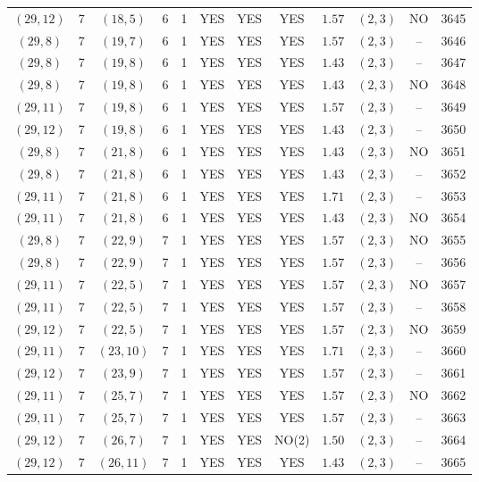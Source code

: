 \begin{longtable}{|c|c|c|c|c|c|c|c|c|c|c|c|}
$(29,12)$ & 7 & $(18,5)$ & 6 & 1 & YES & YES & YES & $1.57$ & $(2,3)$ & NO & 3645\\
$(29,8)$ & 7 & $(19,7)$ & 6 & 1 & YES & YES & YES & $1.57$ & $(2,3)$ & -- & 3646\\
$(29,8)$ & 7 & $(19,8)$ & 6 & 1 & YES & YES & YES & $1.43$ & $(2,3)$ & -- & 3647\\
$(29,8)$ & 7 & $(19,8)$ & 6 & 1 & YES & YES & YES & $1.43$ & $(2,3)$ & NO & 3648\\
$(29,11)$ & 7 & $(19,8)$ & 6 & 1 & YES & YES & YES & $1.57$ & $(2,3)$ & -- & 3649\\
$(29,12)$ & 7 & $(19,8)$ & 6 & 1 & YES & YES & YES & $1.43$ & $(2,3)$ & -- & 3650\\
$(29,8)$ & 7 & $(21,8)$ & 6 & 1 & YES & YES & YES & $1.43$ & $(2,3)$ & NO & 3651\\
$(29,8)$ & 7 & $(21,8)$ & 6 & 1 & YES & YES & YES & $1.43$ & $(2,3)$ & -- & 3652\\
$(29,11)$ & 7 & $(21,8)$ & 6 & 1 & YES & YES & YES & $1.71$ & $(2,3)$ & -- & 3653\\
$(29,11)$ & 7 & $(21,8)$ & 6 & 1 & YES & YES & YES & $1.43$ & $(2,3)$ & NO & 3654\\
$(29,8)$ & 7 & $(22,9)$ & 7 & 1 & YES & YES & YES & $1.57$ & $(2,3)$ & NO & 3655\\
$(29,8)$ & 7 & $(22,9)$ & 7 & 1 & YES & YES & YES & $1.57$ & $(2,3)$ & -- & 3656\\
$(29,11)$ & 7 & $(22,5)$ & 7 & 1 & YES & YES & YES & $1.57$ & $(2,3)$ & NO & 3657\\
$(29,11)$ & 7 & $(22,5)$ & 7 & 1 & YES & YES & YES & $1.57$ & $(2,3)$ & -- & 3658\\
$(29,12)$ & 7 & $(22,5)$ & 7 & 1 & YES & YES & YES & $1.57$ & $(2,3)$ & NO & 3659\\
$(29,11)$ & 7 & $(23,10)$ & 7 & 1 & YES & YES & YES & $1.71$ & $(2,3)$ & -- & 3660\\
$(29,12)$ & 7 & $(23,9)$ & 7 & 1 & YES & YES & YES & $1.57$ & $(2,3)$ & -- & 3661\\
$(29,11)$ & 7 & $(25,7)$ & 7 & 1 & YES & YES & YES & $1.57$ & $(2,3)$ & NO & 3662\\
$(29,11)$ & 7 & $(25,7)$ & 7 & 1 & YES & YES & YES & $1.57$ & $(2,3)$ & -- & 3663\\
$(29,12)$ & 7 & $(26,7)$ & 7 & 1 & YES & YES & NO(2) & $1.50$ & $(2,3)$ & -- & 3664\\
$(29,12)$ & 7 & $(26,11)$ & 7 & 1 & YES & YES & YES & $1.43$ & $(2,3)$ & -- & 3665\\

\end{longtable}
